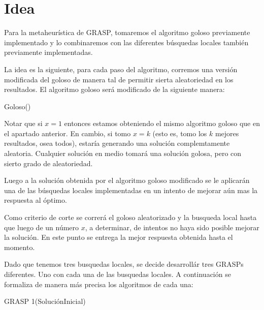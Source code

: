 \section{Idea}


Para la metaheurística de GRASP, tomaremos el algoritmo goloso previamente implementado y lo combinaremos con las diferentes búsquedas locales también previamente implementadas.

La idea es la siguiente, para cada paso del algoritmo, corremos una versión modificada del goloso de manera tal de permitir sierta aleatoriedad en los resultados. El algoritmo goloso será modificado de la siguiente manera:

\begin{algorithm}
  \begin{algorithmic}[1]\parskip=1mm
 \caption{ Goloso()}
\end{algorithmic}
\end{algorithm} 

Notar que si $x=1$ entonces estamos obteniendo el mismo algoritmo goloso que en el apartado anterior. En cambio, si tomo $x = k$ (esto es, tomo los $k$ mejores resultados, osea todos), estaría generando una solución complemtamente aleatoria. Cualquier solución en medio tomará una solución golosa, pero con sierto grado de aleatoriedad.

Luego a la solución obtenida por el algoritmo goloso modificado se le aplicarán una de las búsquedas locales implementadas en un intento de mejorar aún mas la respuesta al óptimo.

Como criterio de corte se correrá el goloso aleatorizado y la busqueda local hasta que luego de un número $x$, a determinar, de intentos no haya sido posible mejorar la solución. En este punto se entrega la mejor respuesta obtenida hasta el momento.

Dado que tenemos tres busquedas locales, se decide desarrollár tres GRASPs diferentes. Uno con cada una de las busquedas locales. A continuación se formaliza de manera más precisa los algoritmos de cada una:

\begin{algorithm}
  	\begin{algorithmic}[1]\parskip=1mm
		 \caption{ GRASP 1(SoluciónInicial) }
	\end{algorithmic}
\end{algorithm}

